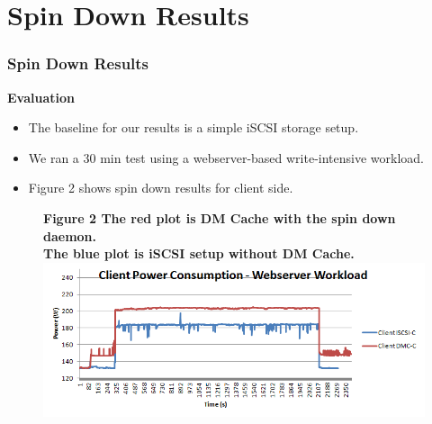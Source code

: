 \documentclass{beamer}
\begin{document}
\section{Spin Down Results}
%
\begin{frame}
    \frametitle{Spin Down Results}
    \bf Evaluation \rm
	\begin{itemize}
	    \item The baseline for our results is a simple iSCSI storage setup.
	    \item We ran a 30 min test using a webserver-based write-intensive workload.
	    \item Figure 2 shows spin down results for client side.
	\end{itemize}
    \begin{figure}
	    \raggedright \bf Figure 2 \rm The red plot is DM Cache with the spin down daemon. \\
	    The blue plot is iSCSI setup without DM Cache. \\
	    \vspace{5pt}
	    \centering \includegraphics[scale=.45]{image.png}
	    \label{fig:results}
    \end{figure}
\end{frame}
\end{document}
